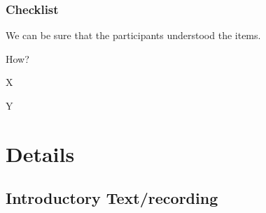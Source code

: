 \documentclass[
    numbers=noenddot,
    open=any,
    paper=a4,
    oneside,
    pagesize,
    captions=tableheading,
    bibliography=totoc,
    11pt
    ]{scrbook}
\newcommand{\cmark}{\ding{51}}%
\newcommand{\xmark}{\ding{55}}%
\newcommand{\done}{\rlap{$\square$}{\raisebox{2pt}{\large\hspace{1pt}\cmark}}%
    \hspace{-2.5pt}}
\newcommand{\wontfix}{\rlap{$\square$}{\large\hspace{1pt}\xmark}}
\begin{document}
\hypertarget{checklist}{%
\section{Checklist}\label{checklist}}

\begin{todolist}
  \item[\done] We can be sure that the participants understood the items.

  How? 

  \item X

  \item[\wontfix] Y
\end{todolist}

\hypertarget{details}{%
\part{Details}\label{details}}

\hypertarget{introductory-textrecording}{%
\chapter{Introductory Text/recording}\label{introductory-textrecording}}

\textcite{tarski1944semantic}

\textcite{dayal2009variation}

    \printbibliography[heading=bibintoc]
\end{document}
